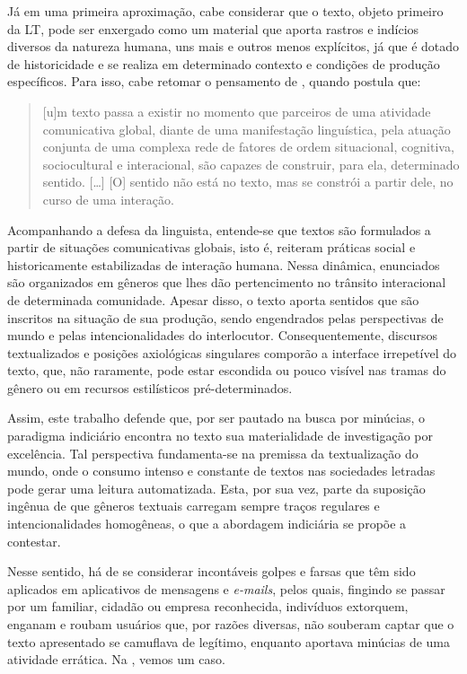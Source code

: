 \documentclass[portuguese]{textolivre}
\begin{document}
Já em uma primeira aproximação, cabe considerar que o texto, objeto primeiro da LT, pode ser enxergado como um material que aporta rastros e indícios diversos da natureza humana, uns mais e outros menos explícitos, já que é dotado de historicidade e se realiza em determinado contexto e condições de produção específicos. Para isso, cabe retomar o pensamento de \textcite[p. 25-26]{koch2003texto}, quando postula que:

\begin{quote}
    [u]m texto passa a existir no momento que parceiros de uma atividade comunicativa global, diante de uma manifestação linguística, pela atuação conjunta de uma complexa rede de fatores de ordem situacional, cognitiva, sociocultural e interacional, são capazes de construir, para ela, determinado sentido. […] [O] sentido não está no texto, mas se constrói a partir dele, no curso de uma interação.
\end{quote}

Acompanhando a defesa da linguista, entende-se que textos são formulados a partir de situações comunicativas globais, isto é, reiteram práticas social e historicamente estabilizadas de interação humana. Nessa dinâmica, enunciados são organizados em gêneros que lhes dão pertencimento no trânsito interacional de determinada comunidade. Apesar disso, o texto aporta sentidos que são inscritos na situação de sua produção, sendo engendrados pelas perspectivas de mundo e pelas intencionalidades do interlocutor. Consequentemente, discursos textualizados e posições axiológicas singulares comporão a interface irrepetível do texto, que, não raramente, pode estar escondida ou pouco visível nas tramas do gênero ou em recursos estilísticos pré-determinados.

Assim, este trabalho defende que, por ser pautado na busca por minúcias, o paradigma indiciário encontra no texto sua materialidade de investigação por excelência. Tal perspectiva fundamenta-se na premissa da textualização do mundo, onde o consumo intenso e constante de textos nas sociedades letradas pode gerar uma leitura automatizada. Esta, por sua vez, parte da suposição ingênua de que gêneros textuais carregam sempre traços regulares e intencionalidades homogêneas, o que a abordagem indiciária se propõe a contestar.

Nesse sentido, há de se considerar incontáveis golpes e farsas que têm sido aplicados em aplicativos de mensagens e \textit{e-mails}, pelos quais, fingindo se passar por um familiar, cidadão ou empresa reconhecida, indivíduos extorquem, enganam e roubam usuários que, por razões diversas, não souberam captar que o texto apresentado se camuflava de legítimo, enquanto aportava minúcias de uma atividade errática. Na , vemos um caso.
\end{document}
